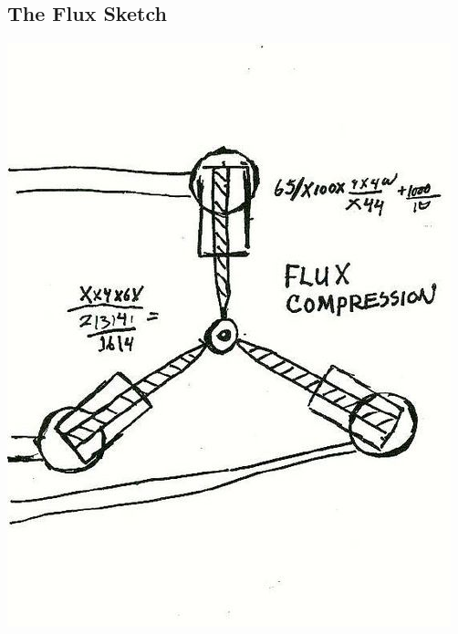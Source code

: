 \begin{appendices}


    \section{The Flux Sketch}
    \includegraphics[width=\textwidth]{Appendices/flux_sketch.jpg}
    \label{appx: Flux Sketch}

\end{appendices}
